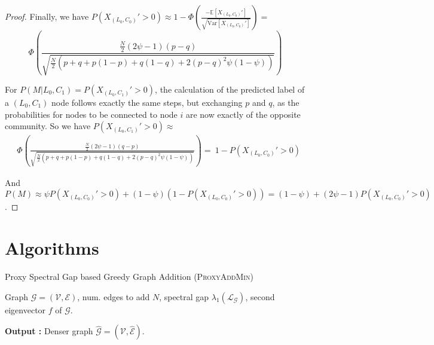 \begin{proof}
Finally, we have $P(X_{(L_0,C_0)}' > 0) \approx 1 - \Phi\left(\frac{-\mathbb{E}[X_{(L_0,C_0)}']}{\sqrt{ \text{Var}[X_{(L_0,C_0)}']}} \right) =$ $$\Phi\left(
\frac{\frac{N}{2} (2 \psi - 1) (p - q)}{\sqrt{\frac{N}{2} ( p+q + p(1-p) + q(1- q)  +  2(p-q)^2\psi(1-\psi) )}}
\right)$$

For $P(M|L_0, C_1) = P(X_{(L_0, C_1)}' > 0)$, the calculation of the predicted label of a $(L_0,C_1)$ node follows exactly the same steps, but exchanging $p$ and $q$, as the probabilities for nodes to be connected to node $i$ are now exactly of the opposite community. So we have $P(X_{(L_0, C_1)}' > 0) \approx $ 
 \begin{align*}
&\Phi\left(
\frac{\frac{N}{2} (2 \psi - 1) (q - p)}{\sqrt{\frac{N}{2} ( p+q + p(1-p) + q(1- q)  +  2(p-q)^2\psi(1-\psi) )}}
\right) =\  1-P(X_{(L_0,C_0)}' > 0)
 \end{align*}

And $
P(M) \approx \psi P(X_{(L_0,C_0)}' > 0) + (1-\psi)(1-P(X_{(L_0,C_0)}' > 0)) = (1-\psi)+(2\psi-1)P(X_{(L_0,C_0)}' > 0)$. 
\end{proof}

\section{Algorithms}\label{app:algs}






\begin{algorithm} [t]
   \caption{Proxy Spectral Gap based Greedy Graph Addition (\textsc{ProxyAddMin})}
   \label{alg:proxyaddmin}
   \begin{algorithmic}
       \REQUIRE \!\!Graph ${\mathcal{G}} = (\mathcal{V},{\mathcal{E}})$, num. edges to add $N$, spectral gap $ \lambda_1(\mathcal{L}_{{\mathcal{G}}})$, second eigenvector ${f}$ of ${\mathcal{G}}$.
       \REPEAT
       \ENDFOR \\
           \vspace{-\medskipamount}
       
           \textbf{Output :} Denser graph $ \hat{\mathcal{G}} = (\mathcal{V},\hat{\mathcal{E}})$.
       \end{algorithmic}
\end{algorithm}


